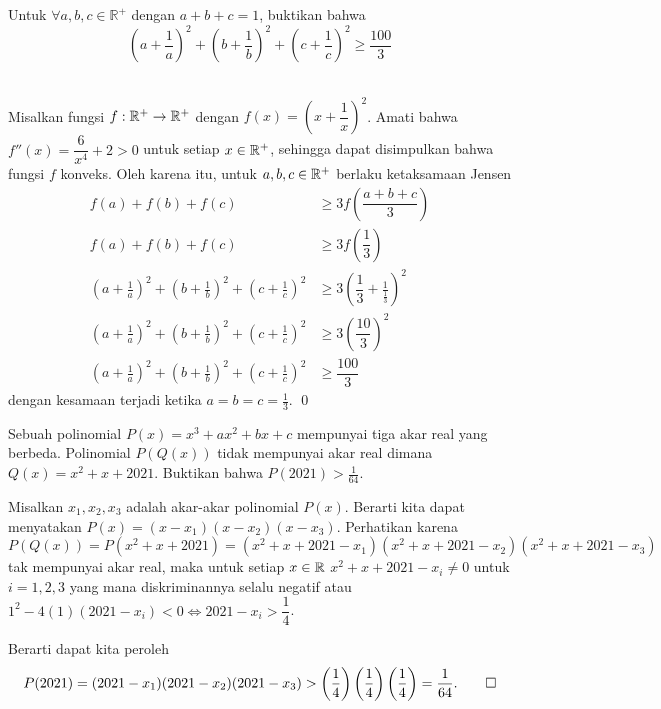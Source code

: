 \documentclass[11pt]{scrartcl}
\begin{document}
	\vspace{8pt}
	\begin{soalbaru} 
		 Untuk $\forall a,b,c \in\mathbb{R^+}$ dengan $a+b+c=1$, buktikan bahwa $$\left( a+\frac{1}{a} \right)^2+\left( b+\frac{1}{b} \right)^2+\left( c+\frac{1}{c} \right)^2 \ge \frac{100}{3}$$\\[-20pt]
		 
		 \begin{solusi}
		 Misalkan fungsi $f: \mathbb R^+ \rightarrow \mathbb R^+$ dengan $f(x)=\left(x+\dfrac{1}{x}\right)^2$. Amati bahwa $f''(x)=\dfrac{6}{x^4}+2>0$ untuk setiap $x \in \mathbb R^+$, sehingga dapat disimpulkan bahwa fungsi $f$ konveks. Oleh karena itu, untuk $a,b,c \in \mathbb R^+$ berlaku ketaksamaan Jensen
		 \begin{equation*}
		 \begin{split}
		 f(a)+f(b)+f(c) &\ge 3f\left(\dfrac{a+b+c}{3}\right)\\
		 f(a)+f(b)+f(c) &\ge 3f\left(\dfrac{1}{3}\right)\\
		 \left( a+\frac{1}{a} \right)^2+\left( b+\frac{1}{b} \right)^2+\left( c+\frac{1}{c} \right)^2 &\ge 3\left( \dfrac{1}{3}+\frac{1}{\frac{1}{3}} \right)^2\\
		 \left( a+\frac{1}{a} \right)^2+\left( b+\frac{1}{b} \right)^2+\left( c+\frac{1}{c} \right)^2 &\ge 3\left( \dfrac{10}{3} \right)^2\\
		 \left( a+\frac{1}{a} \right)^2+\left( b+\frac{1}{b} \right)^2+\left( c+\frac{1}{c} \right)^2 &\ge  \dfrac{100}{3} 
		 \end{split}
		 \end{equation*}
		 dengan kesamaan terjadi ketika $a=b=c=\frac{1}{3}$. \qed
		 \end{solusi}
	\end{soalbaru}
	
	\begin{soalbaru}
		Sebuah polinomial $P(x)=x^3+ax^2+bx+c$ mempunyai tiga akar real yang berbeda. Polinomial $P(Q(x))$ tidak mempunyai akar real dimana $Q(x)=x^2+x+2021$. Buktikan bahwa $P(2021)>\frac{1}{64}$.\\[-10pt]
		
		\begin{solusi}
		Misalkan $x_1,x_2,x_3$ adalah akar-akar polinomial $P(x)$. Berarti kita dapat menyatakan $P(x)=(x-x_1)(x-x_2)(x-x_3)$. 
		Perhatikan karena $$P(Q(x))=P(x^2+x+2021)=(x^2+x+2021-x_1)(x^2+x+2021-x_2)(x^2+x+2021-x_3)$$
		tak mempunyai akar real, maka untuk setiap $x\in \mathbb R$ $x^2+x+2021-x_i \neq 0$ untuk $i=1,2,3$ yang mana diskriminannya selalu negatif atau $1^2 - 4(1)(2021-x_i) < 0 \iff 2021-x_i > \dfrac14$.
		
		Berarti dapat kita peroleh 
		$$P(2021)=(2021-x_1)(2021-x_2)(2021-x_3) > \left(\dfrac14\right)\left(\dfrac14\right)\left(\dfrac14\right)=\dfrac{1}{64}.\qed$$ 
		\end{solusi}
	\end{soalbaru}
	
\end{document}
